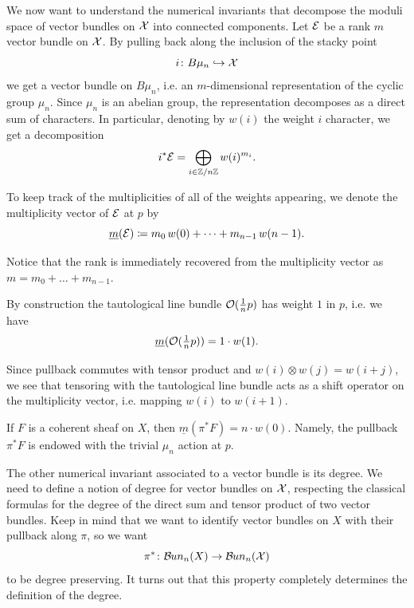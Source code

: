 \documentclass{article}
\begin{document}
We now want to understand the numerical invariants that decompose the moduli space of vector bundles on $\mathcal{X}$ into connected components. Let $\mathcal{E}$ be a rank $m$ vector bundle on $\mathcal{X}$. By pulling back along the inclusion of the stacky point
\begin{equation}
i \colon B \mu_n \hookrightarrow \mathcal{X}
\end{equation}
we get a vector bundle on $B \mu_n$, i.e. an $m$-dimensional representation of the cyclic group $\mu_n$. Since $\mu_{n}$ is an abelian group, the representation decomposes as a direct sum of characters. In particular, denoting by $w(i)$ the weight $i$ character, we get a decomposition
\[
i^* \mathcal{E} = \bigoplus_{i \in \mathbb{Z} / n \mathbb{Z}} w(i)^{m_{i}}.
\]
\begin{defi}\cite[Definition 1.2.7]{Taams}
To keep track of the multiplicities of all of the weights appearing, we denote the multiplicity vector of $\mathcal{E}$ at $p$ by
\[
\underline{m}(\mathcal{E}) \coloneqq m_0 \, w(0) + \dots + m_{n-1} \, w(n-1).
\]
\end{defi}
Notice that the rank is immediately recovered from the multiplicity vector as $m = m_0 + \dots + m_{n-1}$.

By construction the tautological line bundle $\mathcal{O}(\tfrac{1}{n}p)$ has weight $1$ in $p$, i.e. we have
\begin{equation}
\underline{m}(\mathcal{O}(\tfrac{1}{n}p)) = 1 \cdot w(1).
\end{equation}

\begin{rmk}\cite[\S 1.2]{Taams} \label{tensor shift}
Since pullback commutes with tensor product and $w(i) \otimes w(j) = w(i+j)$, we see that tensoring with the tautological line bundle acts as a shift operator on the multiplicity vector, i.e. mapping $w(i)$ to $w(i+1)$.
\end{rmk}


\begin{prop}\cite[Example 1.2.9]{Taams} \label{multiplicity of pullback}
If $F$ is a coherent sheaf on $X$, then $\underline{m}(\pi^* F) = n \cdot w(0)$. Namely, the pullback $\pi^* F$ is endowed with the trivial $\mu_{n}$ action at $p$.
\end{prop}

The other numerical invariant associated to a vector bundle is its degree. We need to define a notion of degree for vector bundles on $\mathcal{X}$, respecting the classical formulas for the degree of the direct sum and tensor product of two vector bundles. Keep in mind that we want to identify vector bundles on $X$ with their pullback along $\pi$, so we want
\begin{equation}
\pi^* \colon \mathcal{B}\kern -.5pt un_n(X) \to \mathcal{B}\kern -.5pt un_n(\mathcal{X})
\end{equation}
to be degree preserving. It turns out that this property completely determines the definition of the degree.
\end{document}
